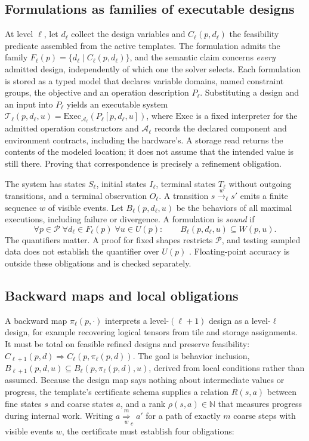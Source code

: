 \documentclass[11pt]{article}
\begin{document}
\subsection{Formulations as families of executable designs}\label{sec:families}

At level \(\ell\), let \(d_\ell\) collect the design variables and \(C_\ell(p,d_\ell)\) the feasibility predicate assembled from the active templates. The formulation admits the family \(F_\ell(p)=\{d_\ell \mid C_\ell(p,d_\ell)\}\), and the semantic claim concerns \emph{every} admitted design, independently of which one the solver selects. Each formulation is stored as a typed model that declares variable domains, named constraint groups, the objective and an operation description \(P_\ell\). Substituting a design and an input into \(P_\ell\) yields an executable system \(\mathcal T_\ell(p,d_\ell,u)=\mathrm{Exec}_{\mathcal A_\ell}(P_\ell[p,d_\ell,u])\), where \(\mathrm{Exec}\) is a fixed interpreter for the admitted operation constructors and \(\mathcal A_\ell\) records the declared component and environment contracts, including the hardware's. A storage read returns the contents of the modeled location; it does not assume that the intended value is still there. Proving that correspondence is precisely a refinement obligation.

The system has states \(S_\ell\), initial states \(I_\ell\), terminal states \(T_\ell\) without outgoing transitions, and a terminal observation \(O_\ell\). A transition \(s\xrightarrow{w}_\ell s'\) emits a finite sequence \(w\) of visible events. Let \(B_\ell(p,d_\ell,u)\) be the behaviors of all maximal executions, including failure or divergence. A formulation is \emph{sound} if
\[
\forall p\in\mathcal P\;\forall d_\ell\in F_\ell(p)\;\forall u\in U(p):\qquad B_\ell(p,d_\ell,u)\subseteq W(p,u).
\]
The quantifiers matter. A proof for fixed shapes restricts \(\mathcal P\), and testing sampled data does not establish the quantifier over \(U(p)\) \cite{r105}. Floating-point accuracy is outside these obligations and is checked separately.

\subsection{Backward maps and local obligations}\label{sec:obligations}

A backward map \(\pi_\ell(p,\cdot)\) interprets a level-\((\ell+1)\) design as a level-\(\ell\) design, for example recovering logical tensors from tile and storage assignments. It must be total on feasible refined designs and preserve feasibility: \(C_{\ell+1}(p,d)\Rightarrow C_\ell(p,\pi_\ell(p,d))\). The goal is behavior inclusion, \(B_{\ell+1}(p,d,u)\subseteq B_\ell(p,\pi_\ell(p,d),u)\), derived from local conditions rather than assumed. Because the design map says nothing about intermediate values or progress, the template's certificate schema supplies a relation \(R(s,a)\) between fine states \(s\) and coarse states \(a\), and a rank \(\rho(s,a)\in\mathbb N\) that measures progress during internal work. Writing \(a\overset{m}{\underset{w}{\Rightarrow}}_c a'\) for a path of exactly \(m\) coarse steps with visible events \(w\), the certificate must establish four obligations:
\end{document}
